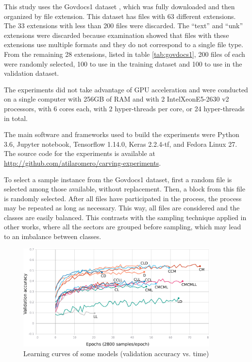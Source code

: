 This study uses the Govdocs1 dataset \cite{garfinkel_bringing_2009}, which was fully downloaded and then organized by file extension. This dataset has files with 63 different extensions. The 33 extensions with less than 200 files were discarded. The  ``text'' and ``unk'' extensions were discarded because examination showed that files with these extensions use multiple formats and they do not correspond to a single file type. From the remaining 28 extensions, listed in table \ref{tab:govdocs1}, 200 files of each were randomly selected, 100 to use in the training dataset and 100 to use in the validation dataset.



The experiments did not take advantage of GPU acceleration and were  conducted on a single computer with 256GB of RAM and with 2 Intel\textregistered Xeon\textregistered E5-2630 v2 processors, with 6 cores each, with 2 hyper-threads per core, or 24 hyper-threads in total. 


The main software and frameworks used to build the experiments were Python 3.6, Jupyter notebook, Tensorflow 1.14.0, Keras 2.2.4-tf, and Fedora Linux 27.
The source code for the experiments is available at \sloppy\url{http://github.com/atilaromero/carving-experiments}.

To select a sample instance from the Govdocs1 dataset, first a random file is selected among those available, without replacement. Then, a block from this file is randomly selected. After all files have participated in the process, the process may be repeated as long as necessary. This way, all files are considered and the classes are easily balanced.
This contrasts with the sampling technique applied in other works, where all the sectors are grouped before sampling, which may lead to an imbalance between classes.
\noindent
\begin{figure}[htb!]
\centering\includegraphics[width=0.9\textwidth]{content/epoch_val_categorical_accuracy.png}
\caption{\label{fig:learning}Learning curves of some models (validation accuracy vs. time)}%
\end{figure}


